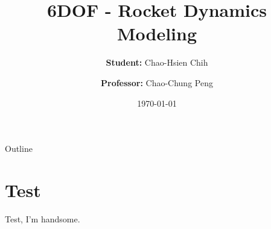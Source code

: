 \documentclass[10pt,xcolor={x11names}]{beamer}
\title[6DOF - Rocket Dynamics Modeling]
{6DOF - Rocket Dynamics Modeling}
\author[P46104269@gs.ncku.edu.tw]{\textbf{Student:} Chao-Hsien Chih \and \textbf{Professor:} Chao-Chung Peng }
\institute[NCKU-IAA IEC-Lab] %
{

    \begin{tabular}{cc}
        \begin{minipage}{0.15\linewidth}
            \begin{figure}
                \texttt{[image: IEC\_Lab\_Logo.png]}
            \end{figure}
        \end{minipage}
        &
        \begin{minipage}{0.6\linewidth}
            Intelligent Embedded Control Lab (IEC-Lab) \\
            Department of Aeronautics and Astronautics \\
            National Cheng Kung University \\
            Tainan, Taiwan 
        \end{minipage}
    \end{tabular}
}
\date{\today}
\begin{document}
\begin{frame}
    \maketitle
\end{frame}

\begin{frame}{Outline}
    \tableofcontents
\end{frame}

\section{Test}

\begin{frame}
    Test, I'm handsome.
\end{frame}
\end{document}
